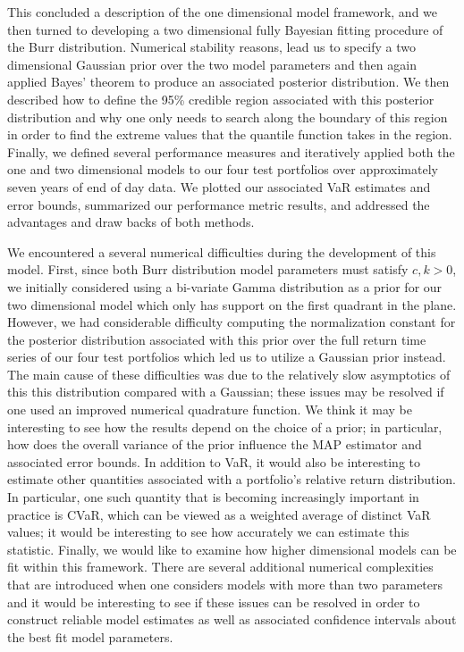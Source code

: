 \documentclass{amsart}
\begin{document}
This concluded a description of the one dimensional model framework, and we then turned to 
developing a two dimensional fully Bayesian fitting procedure of the Burr distribution.
Numerical stability reasons, lead us to specify 
a two dimensional Gaussian prior over the two model parameters and then 
again applied Bayes' theorem to produce an associated posterior distribution.  We then 
described how to define the 95\% credible region associated with this posterior 
distribution and why one only needs to search along the boundary of this region in order 
to find the extreme values that the quantile function takes in the region.
Finally, we defined several performance 
measures and iteratively applied both the one and two dimensional models to our four 
test portfolios over approximately seven years of end of day data.  We plotted our 
associated VaR estimates  and error bounds, 
summarized our performance metric results, and addressed the advantages 
and draw backs of both methods.
    
We encountered a several numerical difficulties during the development of this model.  First, 
since both Burr distribution model parameters must satisfy $c,k>0$, we initially considered using 
a bi-variate Gamma distribution \cite{Furman-08}
as a prior for our two dimensional model which only has support on  
the first quadrant in the plane. However, we had considerable difficulty computing the normalization 
constant for the posterior distribution associated with this prior over the full return time 
series of our four test portfolios which led 
us to utilize a Gaussian prior instead. The main cause of these difficulties was 
due to the relatively slow asymptotics of this this distribution compared with a Gaussian; these issues 
may be resolved if one used an improved numerical quadrature function. 
We think it may be interesting to see how the results depend on 
the choice of a prior; in particular, how does the overall variance of the prior influence the 
MAP estimator and associated error bounds.  In addition to VaR, it would also be interesting 
to estimate other quantities associated with a portfolio's relative return distribution.
In particular, one such quantity that is becoming increasingly important 
in practice is CVaR, which can be viewed as a weighted average of distinct VaR values;  
it would be interesting to see how accurately we can estimate this statistic.  Finally, 
we would like to examine how higher dimensional models can be fit within this framework.  
There are several additional numerical complexities that are introduced when one considers
models with more than two parameters and it would be interesting to see if these issues can 
be resolved in order to construct reliable model estimates as well as associated confidence 
intervals about the best fit model parameters.
\end{document}
